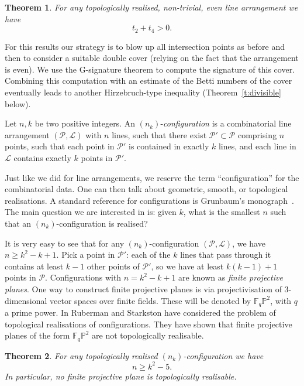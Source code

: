\documentclass[a4paper,12pt, onesided]{amsart}
\newtheorem{thm}{Theorem}[section]
\theoremstyle{remark}
\numberwithin{figure}{section}
\numberwithin{equation}{section}
\newcommand{\cP}{\mathcal{P}}
\renewcommand{\L}{\mathcal{L}}
\begin{document}
\begin{thm}\label{thm:evenbound}
    For any topologically realised, non-trivial, even line arrangement we have
    \[
    t_2+t_4>0.
    \]
\end{thm}

For this results our strategy is to blow up
all intersection points as before and then to consider a suitable double cover (relying on the fact that the arrangement is even). We use the G-signature theorem to compute the signature of this cover. Combining this computation with an estimate of the Betti numbers of the cover eventually leads to another Hirzebruch-type inequality (Theorem~\ref{t:divisible} below). 


Let $n, k$ be two positive integers. An $(n_k)$-\emph{configuration} is a combinatorial line arrangement $(\cP, \L)$ with $n$ lines, such that there exist $\cP' \subset \cP$ comprising $n$ points, such that each point in $\cP'$ is contained in exactly $k$ lines, and each line in $\L$ contains exactly $k$ points in $\cP'$.

Just like we did for line arrangements, we reserve the term ``configuration'' for the combinatorial data. One can then talk about geometric, smooth, or topological realisations. A standard reference for configurations is Grunbaum's monograph~\cite{Grunbaum:2009}. The main question we are interested in is: given $k$, what is the smallest $n$ such that an $(n_k)$-configuration is realised?

It is very easy to see that for any $(n_k)$-configuration $(\cP,\L)$, we have $n \ge k^2-k+1$.
Pick a point in $\cP'$: each of the $k$ lines that pass through it contains at least $k-1$ other points of $\cP'$, so we have at least $k(k-1)+1$ points in $\cP$. Configurations with $n=k^2-k+1$
are known as \emph{finite projective planes}.
One way to construct finite projective planes  is via projectivisation of 3-dimensional vector spaces over finite fields. These will be denoted by $\mathbb{F}_q\mathbb{P}^2$, with $q$ a prime power. In \cite{Ruberman-Starkston:2016} Ruberman and Starkston have considered the problem of topological realisations of configurations. They have shown that finite projective planes of the form $\mathbb{F}_q\mathbb{P}^2$ are not topologically realisable. 

\begin{thm}
   For any topologically realised $(n_k)$-configuration we have
   \[
   n\geq k^2-5.
   \]
   In particular, no finite projective plane is topologically realisable.
\end{thm}
\end{document}
